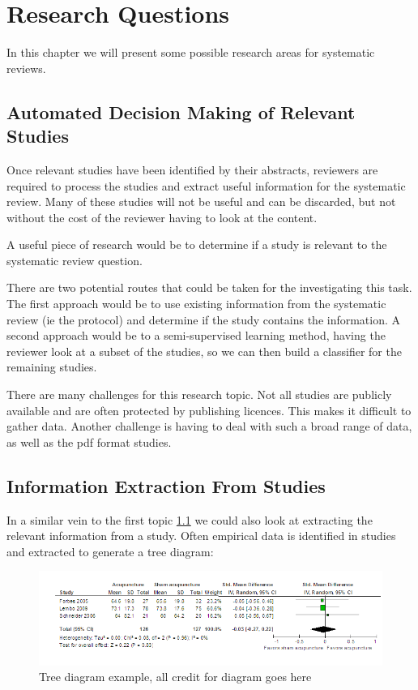 \chapter{Research Questions} \label{rq}

In this chapter we will present some possible research areas for systematic reviews.

\section{Automated Decision Making of Relevant Studies} \label{dm}

Once relevant studies have been identified by their abstracts, reviewers are required to process the studies and extract useful information for the systematic review. Many of these studies will not be useful and can be discarded, but not without the cost of the reviewer having to look at the content.

A useful piece of research would be to determine if a study is relevant to the systematic review question.

There are two potential routes that could be taken for the investigating this task. The first approach would be to use existing information from the systematic review (ie the protocol) and determine if the study contains the information. A second approach would be to a semi-supervised learning method, having the reviewer look at a subset of the studies, so we can then build a classifier for the remaining studies.

There are many challenges for this research topic. Not all studies are publicly available and are often protected by publishing licences. This makes it difficult to gather data. Another challenge is having to deal with such a broad range of data, as well as the pdf format studies.

\section{Information Extraction From Studies} \label{ie}

In a similar vein to the first topic \ref{dm} we could also look at extracting the relevant information from a study. Often empirical data is identified in studies and extracted to generate a tree diagram:

\begin{figure}[H]
\center
\includegraphics[width=16cm]{figures/tree.png}
\caption{Tree diagram example, all credit for diagram goes here \cite{Manheimer2012}}
\end{figure}

